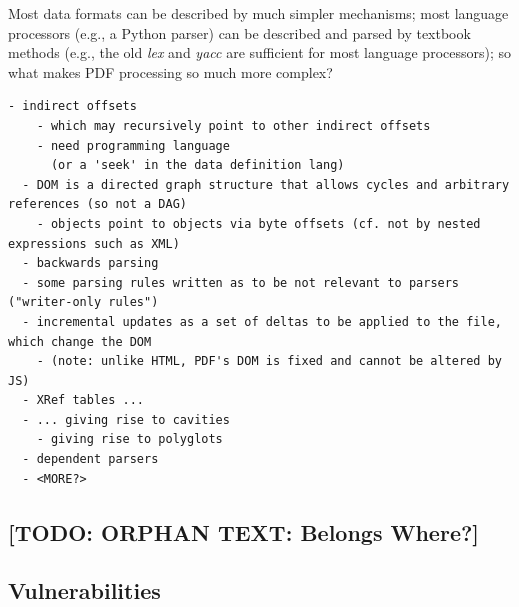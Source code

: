 Most data formats can be described by much simpler mechanisms;
most language processors (e.g., a Python parser) can be described and parsed by
textbook methods (e.g., the old \emph{lex} and \emph{yacc} are sufficient for
most language processors);
so what makes PDF processing so much more complex?
\begin{lstlisting}[style=meta]
  - indirect offsets
    - which may recursively point to other indirect offsets
    - need programming language
      (or a 'seek' in the data definition lang)
  - DOM is a directed graph structure that allows cycles and arbitrary references (so not a DAG)
    - objects point to objects via byte offsets (cf. not by nested expressions such as XML)  
  - backwards parsing
  - some parsing rules written as to be not relevant to parsers ("writer-only rules")
  - incremental updates as a set of deltas to be applied to the file, which change the DOM
    - (note: unlike HTML, PDF's DOM is fixed and cannot be altered by JS)
  - XRef tables ...
  - ... giving rise to cavities
    - giving rise to polyglots
  - dependent parsers
  - <MORE?>
\end{lstlisting}

\subsection{[TODO: ORPHAN TEXT: Belongs Where?]}


\subsection{Vulnerabilities }
\label{sec:predom-vulnerabilities}


